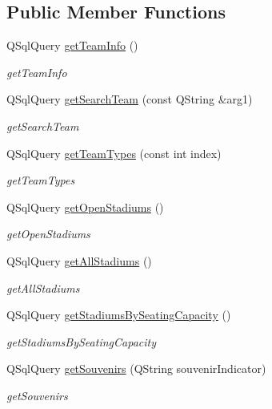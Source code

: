 \subsection*{Public Member Functions}
\begin{DoxyCompactItemize}
\item 
Q\+Sql\+Query \hyperlink{class_database_a7d66de82867475afd95ba8a29fc694fe}{get\+Team\+Info} ()
\begin{DoxyCompactList}\small\item\em get\+Team\+Info \end{DoxyCompactList}\item 
Q\+Sql\+Query \hyperlink{class_database_a8181dd6904b67c1c6db97fc696583d65}{get\+Search\+Team} (const Q\+String \&arg1)
\begin{DoxyCompactList}\small\item\em get\+Search\+Team \end{DoxyCompactList}\item 
Q\+Sql\+Query \hyperlink{class_database_ae4b6ca4c6d269b46fcbf186ecdfc3f80}{get\+Team\+Types} (const int index)
\begin{DoxyCompactList}\small\item\em get\+Team\+Types \end{DoxyCompactList}\item 
Q\+Sql\+Query \hyperlink{class_database_a19033eeb6c069ffb365f06da4a7b9b5e}{get\+Open\+Stadiums} ()
\begin{DoxyCompactList}\small\item\em get\+Open\+Stadiums \end{DoxyCompactList}\item 
Q\+Sql\+Query \hyperlink{class_database_a36269f6c3e0e78bbea4baecaa98f2502}{get\+All\+Stadiums} ()
\begin{DoxyCompactList}\small\item\em get\+All\+Stadiums \end{DoxyCompactList}\item 
Q\+Sql\+Query \hyperlink{class_database_acb70cac23e455f88da5d697a2adb5ae6}{get\+Stadiums\+By\+Seating\+Capacity} ()
\begin{DoxyCompactList}\small\item\em get\+Stadiums\+By\+Seating\+Capacity \end{DoxyCompactList}\item 
Q\+Sql\+Query \hyperlink{class_database_adc23956b138dca3e4d0b22354dfb3a6e}{get\+Souvenirs} (Q\+String souvenir\+Indicator)
\begin{DoxyCompactList}\small\item\em get\+Souvenirs \end{DoxyCompactList}\item 

\end{DoxyCompactItemize}
